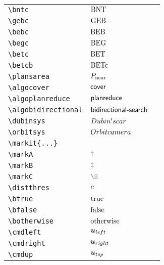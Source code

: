 \begin{longtable}{lll}
 {\color[rgb]{0.5,0.5,0.5}\texttt{\textbackslash bntc}} & $\text{BNT}$ & \\ 
 {\color[rgb]{0.5,0.5,0.5}\texttt{\textbackslash gebc}} & $\text{GEB}$ & \\ 
 {\color[rgb]{0.5,0.5,0.5}\texttt{\textbackslash bebc}} & $\text{BEB}$ & \\ 
 {\color[rgb]{0.5,0.5,0.5}\texttt{\textbackslash begc}} & $\text{BEG}$ & \\ 
 {\color[rgb]{0.5,0.5,0.5}\texttt{\textbackslash betc}} & $\text{BET}$ & \\ 
 {\color[rgb]{0.5,0.5,0.5}\texttt{\textbackslash betcb}} & $\text{BETc}$ & \\ 
 {\color[rgb]{0.5,0.5,0.5}\texttt{\textbackslash plansarea}} & $P_{\text{near}}$ & \\ 
 {\color[rgb]{0.5,0.5,0.5}\texttt{\textbackslash algocover}} & $\textsf{cover}$ & \\ 
 {\color[rgb]{0.5,0.5,0.5}\texttt{\textbackslash algoplanreduce}} & $\textsf{planreduce}$ & \\ 
 {\color[rgb]{0.5,0.5,0.5}\texttt{\textbackslash algobidirectional}} & $\textsf{bidirectional-search}$ & \\ 
 {\color[rgb]{0.5,0.5,0.5}\texttt{\textbackslash dubinsys}} & $Dubin's car$ & \\ 
 {\color[rgb]{0.5,0.5,0.5}\texttt{\textbackslash orbitsys}} & $Orbit camera$ & \\ 
 {\color[rgb]{0.5,0.5,0.5}\texttt{\textbackslash markit\{...\}}} &  & \\ 
 {\color[rgb]{0.5,0.5,0.5}\texttt{\textbackslash markA}} & $\markA$ & \\ 
 {\color[rgb]{0.5,0.5,0.5}\texttt{\textbackslash markB}} & $\markB$ & \\ 
 {\color[rgb]{0.5,0.5,0.5}\texttt{\textbackslash markC}} & $\markC$ & \\ 
 {\color[rgb]{0.5,0.5,0.5}\texttt{\textbackslash distthres}} & $c$ & \\ 
 {\color[rgb]{0.5,0.5,0.5}\texttt{\textbackslash btrue}} & $\text{true}$ & \\ 
 {\color[rgb]{0.5,0.5,0.5}\texttt{\textbackslash bfalse}} & $\text{false}$ & \\ 
 {\color[rgb]{0.5,0.5,0.5}\texttt{\textbackslash botherwise}} & $\text{otherwise}$ & \\ 
 {\color[rgb]{0.5,0.5,0.5}\texttt{\textbackslash cmdleft}} & $\boldsymbol{u}_{left}$ & \\ 
 {\color[rgb]{0.5,0.5,0.5}\texttt{\textbackslash cmdright}} & $\boldsymbol{u}_{right}$ & \\ 
 {\color[rgb]{0.5,0.5,0.5}\texttt{\textbackslash cmdup}} & $\boldsymbol{u}_{top}$ & \\ 

\end{longtable}
